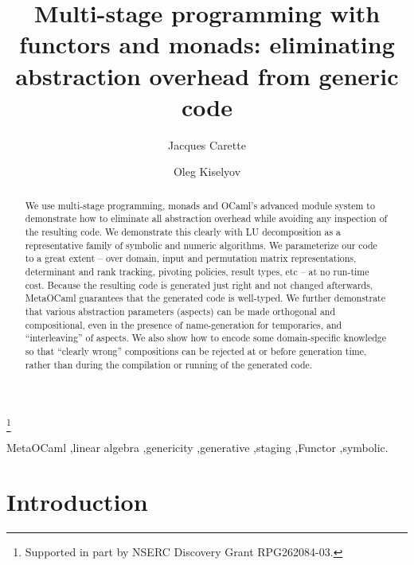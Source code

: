 \documentclass[draft]{elsart}
\begin{document}
\begin{frontmatter}
\title{Multi-stage programming with functors and monads:
eliminating abstraction overhead from generic code}
\author{Jacques Carette}
\address{McMaster University,
1280 Main St. West, Hamilton, Ontario Canada L8S 4K1}
\author{Oleg Kiselyov}
\address{FNMOC, Monterey, CA 93943}


\thanks[1]{Supported in part by NSERC Discovery Grant RPG262084-03.}

\begin{abstract}
We use multi-stage programming, monads and OCaml's
advanced module system to demonstrate how to eliminate all
abstraction overhead while avoiding any inspection of the resulting
code.  We demonstrate this clearly with LU decomposition as a 
representative family of symbolic and numeric algorithms. 
We parameterize our code to a great extent --
over domain, input and permutation matrix representations, 
determinant and rank tracking, 
pivoting policies, result types, etc -- at no run-time cost.  Because
the resulting code is generated just right and not changed afterwards,
MetaOCaml guarantees that the generated code is well-typed.
We further demonstrate that various abstraction parameters (aspects)
can be made orthogonal and compositional, even in the presence of
name-generation for temporaries, and 
``interleaving'' of aspects.  We also show how to encode some
domain-specific knowledge so that ``clearly wrong'' compositions can
be rejected at or before generation time, rather than during
the compilation or running of the generated code.
\end{abstract}

\begin{keyword}
MetaOCaml \sep linear algebra \sep genericity \sep generative \sep staging
\sep Functor \sep symbolic.
\end{keyword}
\end{frontmatter}

\section{Introduction}
\end{document}
